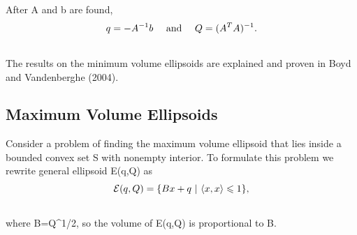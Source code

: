 \documentclass[letterpaper,10pt,english]{sphinxmanual}
\begin{document}
After A and b are found,
\begin{gather}
\begin{split}q=-A^{-1}b ~~~ \mbox{ and } ~~~ Q=(A^TA)^{-1}.\end{split}\notag\\\begin{split}\end{split}\notag
\end{gather}
The results on the minimum volume ellipsoids are explained and proven in
Boyd and Vandenberghe (2004).


\subsection{Maximum Volume Ellipsoids}
\label{chap_ellcalc:maximum-volume-ellipsoids}
Consider a problem of finding the maximum volume ellipsoid that lies
inside a bounded convex set S with nonempty interior. To
formulate this problem we rewrite general ellipsoid
{\mathcal E}(q,Q) as
\begin{gather}
\begin{split}{\mathcal E}(q,Q) = \{Bx + q ~|~ \langle x,x\rangle\leqslant1\},\end{split}\notag\\\begin{split}\end{split}\notag
\end{gather}
where B=Q^{1/2}, so the volume of {\mathcal E}(q,Q) is
proportional to \det B.
\end{document}
